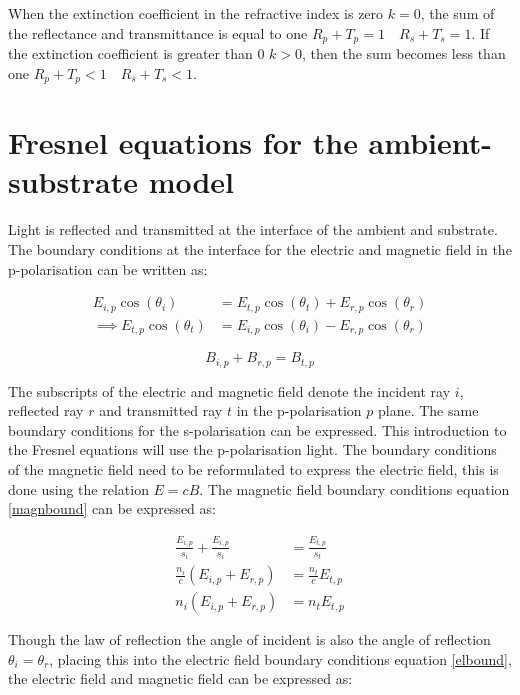 \documentclass[MasterThesisMain.tex]{subfiles}
\begin{document}
When the extinction coefficient in the refractive index is zero $k=0$, the sum of the reflectance and transmittance is equal to one $R_p + T_p = 1 \quad R_s + T_s = 1 $. If the extinction coefficient is greater than 0 $k>0$, then the sum becomes less than one $R_p + T_p < 1 \quad R_s + T_s < 1 $.	
\section{Fresnel equations for the ambient-substrate model}\label{ch:fresnelref}
Light is reflected and transmitted at the interface of the ambient and substrate. The boundary conditions at the interface for the electric and magnetic field in the p-polarisation can be written as:

\begin{align} \label{elbound}
E_{i,p}\cos{(\theta_i)} &= E_{t,p}\cos{(\theta_t)} + E_{r,p}\cos{(\theta_r)}\\
\implies E_{t,p}\cos{(\theta_t)} &= E_{i,p}\cos{(\theta_i)} - E_{r,p}\cos{(\theta_r)}
\end{align} 

\begin{equation} \label{magnbound}
B_{i,p} + B_{r,p} = B_{t,p}
\end{equation}

The subscripts of the electric and magnetic field denote the incident ray $i$, reflected ray $r$ and transmitted ray $t$ in the p-polarisation $p$ plane. The same boundary conditions for the s-polarisation can be expressed. This introduction to the Fresnel equations will use the p-polarisation light. The boundary conditions of the magnetic field need to be reformulated to express the electric field, this is done using the relation $E=cB$. The magnetic field boundary conditions equation \ref{magnbound} can be expressed as:

\begin{align}
\frac{E_{i,p}}{s_i} + \frac{E_{i,p}}{s_i} &= \frac{E_{t,p}}{s_t}\\
\frac{n_i}{c}(E_{i,p}+E_{r,p}) &= \frac{n_t}{c}E_{t,p}\\
n_i(E_{i,p}+E_{r,p}) &= n_tE_{t,p}
\end{align} 

Though the law of reflection the angle of incident is also the angle of reflection $\theta_i=\theta_r$, placing this into the electric field boundary conditions equation \ref{elbound}, the electric field and magnetic field can be expressed as:
\end{document}
